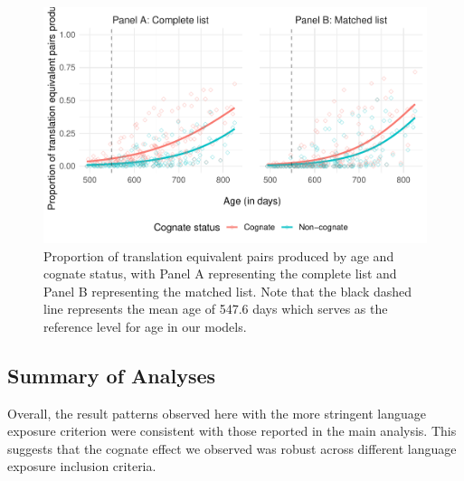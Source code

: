 \documentclass[
  ,man,floatsintext]{apa6}
\begin{document}
\begin{figure}

{\centering \includegraphics[width=1.2\linewidth]{CogVocab_supplemental_files/figure-latex/FigS2-1} 

}

\caption{Proportion of translation equivalent pairs produced by age and cognate status, with Panel A representing the complete list and Panel B representing the matched list. Note that the black dashed line represents the mean age of 547.6 days which serves as the reference level for age in our models.}\label{fig:FigS2}
\end{figure}

\hypertarget{summary-of-analyses}{%
\subsection{Summary of Analyses}\label{summary-of-analyses}}

Overall, the result patterns observed here with the more stringent language exposure criterion were consistent with those reported in the main analysis. This suggests that the cognate effect we observed was robust across different language exposure inclusion criteria.
\end{document}
